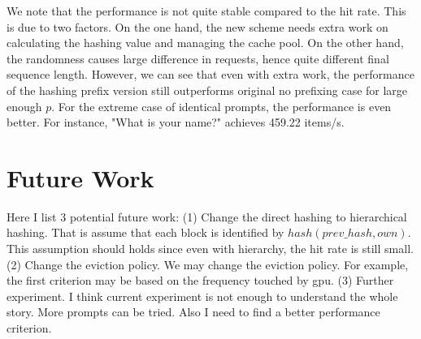 \documentclass{article}
\begin{document}
We note that the performance is not quite stable compared to the hit rate. This is due to two factors. On the one hand, the new scheme needs extra work on calculating the hashing value and managing the cache pool.
On the other hand, the randomness causes large difference in requests, hence quite different final sequence length. However, we can see that even with extra work, the performance of the hashing prefix version still outperforms
original no prefixing case for large enough $p$. For the extreme case of identical prompts, the performance is even better. For instance, "What is your name?" achieves 459.22 items/s.

\section{Future Work}
Here I list $3$ potential future work: (1) Change the direct hashing to hierarchical hashing. That is assume that each block is identified by $hash(prev\_hash, own)$. This assumption should holds since even with hierarchy, the hit rate is 
still small. (2) Change the eviction policy. We may change the eviction policy. For example, the first criterion may be based on the frequency touched by gpu. (3) Further experiment. I think current experiment is not enough to understand the whole story.
More prompts can be tried. Also I need to find a better performance criterion.
\end{document}
